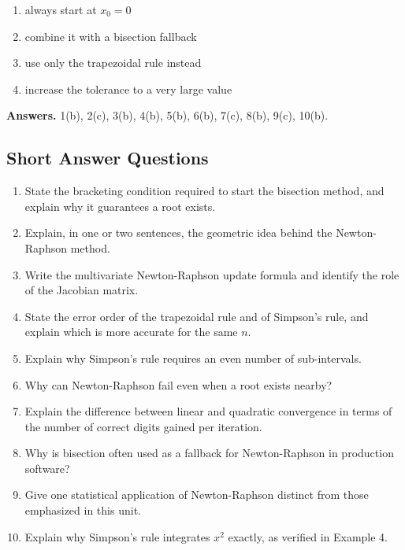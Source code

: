 \documentclass[
]{article}
\providecommand{\tightlist}{%
  \setlength{\itemsep}{0pt}\setlength{\parskip}{0pt}}
\begin{document}
\begin{enumerate}
  \begin{enumerate}
  \def\labelenumii{(\alph{enumii})}
  \tightlist
  \item
    always start at \(x_0=0\)
  \item
    combine it with a bisection fallback
  \item
    use only the trapezoidal rule instead
  \item
    increase the tolerance to a very large value
  \end{enumerate}
\end{enumerate}

\textbf{Answers.} 1(b), 2(c), 3(b), 4(b), 5(b), 6(b), 7(c), 8(b), 9(c),
10(b).

\subsection{Short Answer Questions}\label{short-answer-questions}

\begin{enumerate}
\def\labelenumi{\arabic{enumi}.}
\tightlist
\item
  State the bracketing condition required to start the bisection method,
  and explain why it guarantees a root exists.
\item
  Explain, in one or two sentences, the geometric idea behind the
  Newton-Raphson method.
\item
  Write the multivariate Newton-Raphson update formula and identify the
  role of the Jacobian matrix.
\item
  State the error order of the trapezoidal rule and of Simpson's rule,
  and explain which is more accurate for the same \(n\).
\item
  Explain why Simpson's rule requires an even number of sub-intervals.
\item
  Why can Newton-Raphson fail even when a root exists nearby?
\item
  Explain the difference between linear and quadratic convergence in
  terms of the number of correct digits gained per iteration.
\item
  Why is bisection often used as a fallback for Newton-Raphson in
  production software?
\item
  Give one statistical application of Newton-Raphson distinct from those
  emphasized in this unit.
\item
  Explain why Simpson's rule integrates \(x^2\) exactly, as verified in
  Example 4.
\end{enumerate}
\end{document}
